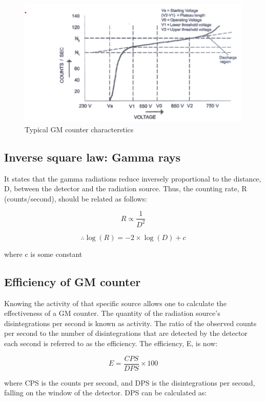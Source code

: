 		\begin{figure}[h]
			\centering
			\includegraphics[width=0.8\linewidth]{images/th1.png}
			\caption{Typical GM counter characterstics}
			\label{fig:th2}
		\end{figure}
	
	\subsection{Inverse square law: Gamma rays}

		It states that the gamma radiations reduce inversely proportional to the distance, D, between the detector and the radiation source. Thus, the counting rate, R (counts/second), should be related as follows:

		$$R \propto \frac{1}{D^2}$$

		$$\therefore\log(R) = -2\times\log(D) + c$$

		where c is some constant

	\subsection{Efficiency of GM counter}

		Knowing the activity of that specific source allows one to calculate the effectiveness of a GM counter. The quantity of the radiation source's disintegrations per second is known as activity. The ratio of the observed counts per second to the number of disintegrations that are detected by the detector each second is referred to as the efficiency. The efficiency, E, is now:

		\begin{equation}
			E = \frac{CPS}{DPS}\times100
			\label{eq:1}
		\end{equation}

		where CPS is the counts per second, and DPS is the disintegrations per second, falling on the window of the detector. DPS can be calculated as:

